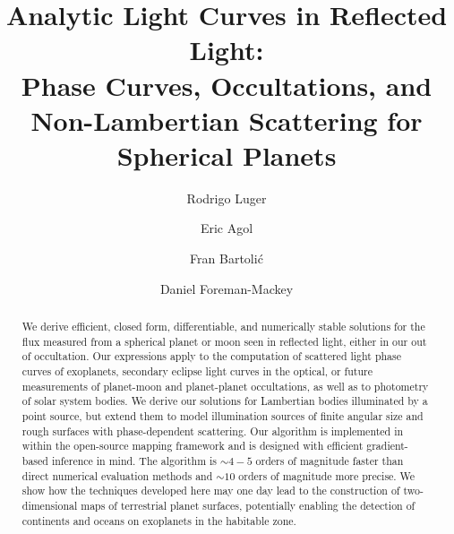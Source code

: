 \documentclass[modern]{aastex62}
\begin{document}
\title{%
    \textbf{
        Analytic Light Curves in Reflected Light:%
        \\%
        Phase Curves, Occultations, and Non-Lambertian Scattering for Spherical Planets
    }
}

\author[0000-0002-0296-3826]{Rodrigo Luger}
%
\author[0000-0002-0802-9145]{Eric Agol}
%
\author[0000-0001-8630-9794]{Fran Bartoli\'c}
%
\author[0000-0002-9328-5652]{Daniel Foreman-Mackey}


\begin{abstract}
    We derive efficient, closed form, differentiable, and numerically stable
    solutions for the flux measured from a spherical planet or moon seen in reflected
    light, either in our out of occultation.
    Our expressions apply to the computation of scattered
    light phase curves of exoplanets, secondary eclipse light curves in
    the optical, or future measurements of planet-moon and planet-planet
    occultations, as well as to photometry of solar system bodies.
    We derive our solutions for Lambertian bodies illuminated by a point
    source, but extend them to model illumination sources of finite
    angular size and rough surfaces with phase-dependent scattering.
    Our algorithm is implemented in \Python within the open-source
    \starry mapping framework and is designed with efficient gradient-based
    inference in mind.
    The algorithm is ${\sim}4-5$ orders of magnitude faster than direct
    numerical evaluation methods and ${\sim}10$ orders of magnitude more
    precise.
    We show how the techniques developed here may one day lead to the
    construction of two-dimensional maps of terrestrial planet surfaces,
    potentially enabling the detection of continents and oceans on
    exoplanets in the habitable zone.
    \href{https://github.com/rodluger/starrynight}{\color{linkcolor}\faGithub}
\end{abstract}
\end{document}
